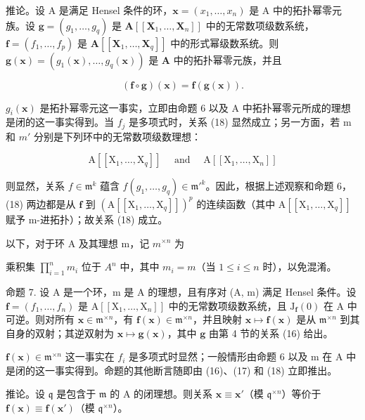 推论。设 A 是满足 Hensel 条件的环，\(\mathbf{x} = (x_{1},\ldots ,x_{n})\) 是 A 中的拓扑幂零元族。设 \(\mathbf{g} = (g_1,\dots,g_q)\) 是 \(\mathbf{A}[[\mathbf{X}_1,\ldots ,\mathbf{X}_n]]\) 中的无常数项级数系统，\(\mathbf{f} = (f_1,\dots,f_p)\) 是 \(\mathbf{A}[[\mathbf{X}_1,\dots,\mathbf{X}_q]]\) 中的形式幂级数系统。则 \(\mathbf{g}(\mathbf{x}) = (g_1(\mathbf{x}),\dots,g_q(\mathbf{x}))\) 是 \(\mathbf{A}\) 中的拓扑幂零元族，并且

\[
(\mathbf {f} \circ \mathbf {g}) (\mathbf {x}) = \mathbf {f} (\mathbf {g} (\mathbf {x})).\tag{18}
\]

\(g_{i}(\mathbf{x})\) 是拓扑幂零元这一事实，立即由命题 6 以及 A 中拓扑幂零元所成的理想是闭的这一事实得到。当 \(f_{j}\) 是多项式时，关系 (18) 显然成立；另一方面，若 m 和 \(m'\) 分别是下列环中的无常数项级数理想：

\[
\mathrm{A} \left[ \left[ \mathrm{X} _ {1}, \dots , \mathrm{X} _ {q} \right] \right] \quad \text { and } \quad \mathrm{A} \left[ \left[ \mathrm{X} _ {1}, \dots , \mathrm{X} _ {n} \right] \right]
\]

则显然，关系 \(f \in \mathfrak{m}^k\) 蕴含 \(f(g_1, \ldots, g_q) \in \mathfrak{m}'^k\)。因此，根据上述观察和命题 6，(18) 两边都是从 \(\mathbf{f}\) 到 \((\mathrm{A}[[\mathrm{X}_1, \ldots, \mathrm{X}_q]])^p\) 的连续函数（其中 \(\mathrm{A}[[\mathrm{X}_1, \ldots, \mathrm{X}_q]]\) 赋予 m-进拓扑）；故关系 (18) 成立。

以下，对于环 A 及其理想 m，记 \(m^{\times n}\) 为

乘积集 \(\prod_{i=1}^{n} m_i\) 位于 \(A^n\) 中，其中 \(m_i = m\)（当 \(1 \leqslant i \leqslant n\) 时），以免混淆。

命题 7. 设 A 是一个环，m 是 A 的理想，且有序对 (A, m) 满足 Hensel 条件。设 \(\mathbf{f} = (f_1, \ldots, f_n)\) 是 \(\mathrm{A}[[\mathrm{X}_1, \ldots, \mathrm{X}_n]]\) 中的无常数项级数系统，且 \(\mathrm{J}_{\mathbf{f}}(0)\) 在 A 中可逆。则对所有 \(\mathbf{x} \in \mathfrak{m}^{\times n}\)，有 \(\mathbf{f}(\mathbf{x}) \in \mathfrak{m}^{\times n}\)，并且映射 \(\mathbf{x} \mapsto \mathbf{f}(\mathbf{x})\) 是从 \(\mathfrak{m}^{\times n}\) 到其自身的双射；其逆双射为 \(\mathbf{x} \mapsto \mathbf{g}(\mathbf{x})\)，其中 \(\mathbf{g}\) 由第 4 节的关系 (16) 给出。

\(\mathbf{f}(\mathbf{x})\in\mathfrak{m}^{\times n}\) 这一事实在 \(f_{i}\) 是多项式时显然；一般情形由命题 6 以及 m 在 A 中是闭的这一事实得到。命题的其他断言随即由 (16)、(17) 和 (18) 立即推出。

推论。设 \(\mathfrak{q}\) 是包含于 \(\mathfrak{m}\) 的 A 的闭理想。则关系 \(\mathbf{x} \equiv \mathbf{x}'\)（模 \(\mathfrak{q}^{\times n}\)）等价于 \(\mathbf{f}(\mathbf{x}) \equiv \mathbf{f}(\mathbf{x}')\)（模 \(\mathfrak{q}^{\times n}\)）。

